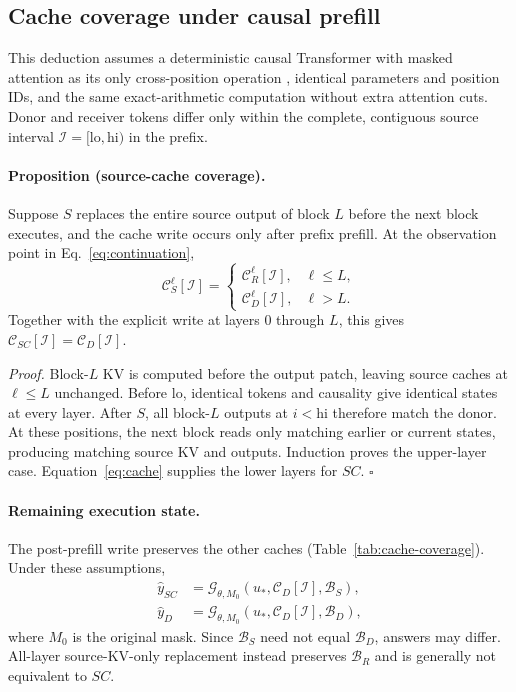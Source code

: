\subsection{Cache coverage under causal prefill}
\label{app:cache-coverage}

This deduction assumes a deterministic causal Transformer with masked
attention as its only cross-position operation
\citep{vaswani2017attention}, identical parameters and position IDs,
and the same exact-arithmetic computation without extra attention cuts.
Donor and receiver tokens differ only within the complete, contiguous
source interval $\mathcal I=[\mathrm{lo},\mathrm{hi})$ in the prefix.

\paragraph{Proposition (source-cache coverage).}
Suppose $S$ replaces the entire source output of block $L$ before the
next block executes, and the cache write occurs only after prefix prefill.
At the observation point in Eq.~\eqref{eq:continuation},
\begin{equation}
\mathcal C_S^\ell[\mathcal I]=
\begin{cases}
\mathcal C_R^\ell[\mathcal I],&\ell\le L,\\
\mathcal C_D^\ell[\mathcal I],&\ell>L.
\end{cases}
\label{eq:source-coverage}
\end{equation}
Together with the explicit write at layers $0$ through $L$, this gives
$\mathcal C_{SC}[\mathcal I]=\mathcal C_D[\mathcal I]$.

\emph{Proof.}
Block-$L$ KV is computed before the output patch, leaving source caches
at $\ell\le L$ unchanged. Before $\mathrm{lo}$, identical tokens and
causality give identical states at every layer. After $S$, all block-$L$
outputs at $i<\mathrm{hi}$ therefore match the donor.
At these positions, the next block reads only matching earlier or
current states, producing matching source KV and outputs.
Induction proves the upper-layer case.
Equation~\eqref{eq:cache} supplies the lower layers for $SC$.
\hfill$\square$



\paragraph{Remaining execution state.}
The post-prefill write preserves the other caches
(Table~\ref{tab:cache-coverage}). Under these assumptions,
\begin{equation}
\begin{aligned}
\hat y_{SC}&=\mathcal G_{\theta,M_0}
 (u_*,\mathcal C_D[\mathcal I],\mathcal B_S),\\
\hat y_D&=\mathcal G_{\theta,M_0}
 (u_*,\mathcal C_D[\mathcal I],\mathcal B_D),
\end{aligned}
\label{eq:source-not-full}
\end{equation}
where $M_0$ is the original mask. Since $\mathcal B_S$ need not equal
$\mathcal B_D$, answers may differ. All-layer source-KV-only replacement
instead preserves $\mathcal B_R$ and is generally not equivalent to $SC$.

